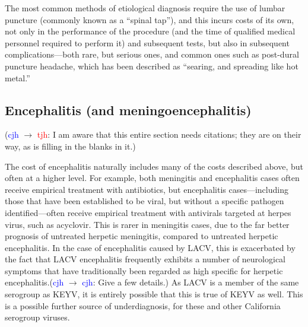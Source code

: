 \documentclass[12pt]{article}
\newcommand{\cjh}{\textcolor{blue}{cjh}}
\newcommand{\tjh}{\textcolor{red}{tjh}}
\newcommand{\msg}[3]{(#1 $\rightarrow$ #2: #3)}
\newcommand{\mcc}[1]{\msg\cjh\cjh{#1}}
\newcommand{\mct}[1]{\msg\cjh\tjh{#1}}
\begin{document}
            The most common methods of etiological diagnosis require the use of lumbar puncture (commonly known as a ``spinal tap''), and this incurs costs of its own, not only in the performance of the procedure (and the time of qualified medical personnel required to perform it) and subsequent tests, but also in subsequent complications---both rare, but serious ones, and common ones such as post-dural puncture headache, which has been described as ``searing, and spreading like hot metal.''\cite{weir2000sharp}

        \subsection{Encephalitis (and meningoencephalitis)}
            \label{cost-encephalitis}
            \mct{I am aware that this entire section needs citations; they are on their way, as is filling in the blanks in it.}

            The cost of encephalitis naturally includes many of the costs described above, but often at a higher level. For example, both meningitis and encephalitis cases often receive empirical treatment with antibiotics, but encephalitis cases---including those that have been established to be viral, but without a specific pathogen identified---often receive empirical treatment with antivirals targeted at herpes virus, such as acyclovir. This is rarer in meningitis cases, due to the far better prognosis of untreated herpetic meningitis, compared to untreated herpetic encephalitis. In the case of encephalitis caused by LACV, this is exacerbated by the fact that LACV encephalitis frequently exhibits a number of neurological symptoms that have traditionally been regarded as high specific for herpetic encephalitis.\mcc{Give a few details.} As LACV is a member of the same serogroup as KEYV, it is entirely possible that this is true of KEYV as well. This is a possible further source of underdiagnosis, for these and other California serogroup viruses.

\end{document}
